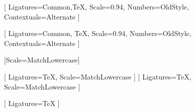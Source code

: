 %



\setmainfont{Skolar PE TEST}[
    Ligatures={Common,TeX},
    Scale=0.94, %
    Numbers={OldStyle},
    Contextuals={Alternate}
]

\setsansfont{Skolar Sans PE TEST}[
    Ligatures={Common, TeX},
    Scale=0.94,
    Numbers={OldStyle},
    Contextuals={Alternate}
]

\setmonofont{Iosevka}[Scale=MatchLowercase]

[
    Ligatures=TeX,
    Scale=MatchLowercase
]
\setmathfontface{}[
    Ligatures=TeX,
    Scale=MatchLowercase
]
\setoperatorfont\mathoper

\newfontface{}[
    Ligatures=TeX
]
